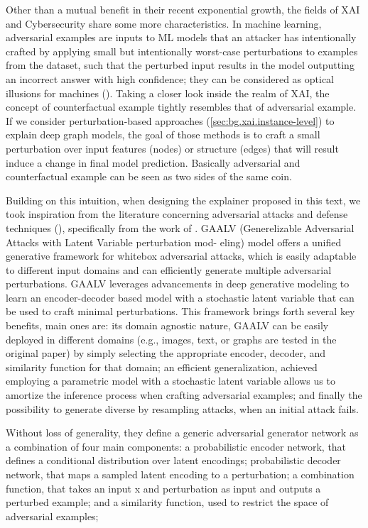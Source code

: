 \documentclass[binding=0.6cm]{sapthesis}
\newcommand{\mycite}[1]{(\cite{#1})}
\begin{document}
Other than a mutual benefit in their recent exponential growth, the fields of XAI and Cybersecurity share some more characteristics. In machine learning, adversarial examples are inputs to ML models that an attacker has intentionally crafted by applying small but intentionally worst-case perturbations to examples from the dataset, such that the perturbed input results in the model outputting an incorrect answer with high confidence; they can be considered as optical illusions for machines \mycite{goodfellow2015-harnessing}. Taking a closer look inside the realm of XAI, the concept of counterfactual example tightly resembles that of adversarial example. If we consider perturbation-based approaches (\cref{sec:bg.xai.instance-level}) to explain deep graph models, the goal of those methods is to craft a small perturbation over input features (nodes) or structure (edges) that will result induce a change in final model prediction. Basically adversarial and counterfactual example can be seen as two sides of the same coin.

Building on this intuition, when designing the explainer proposed in this text, we took inspiration from the literature concerning adversarial attacks and defense techniques \mycite{sun2023-attack-defense}, specifically from the work of \cite{bose2020-gaalvae}. GAALV (Generelizable
Adversarial Attacks with Latent Variable perturbation mod-
eling) model offers a unified generative framework for whitebox adversarial attacks, which is easily adaptable to different input domains and can efficiently generate multiple adversarial perturbations. GAALV leverages advancements in deep generative modeling to learn an encoder-decoder based model with a stochastic latent variable that can be used to craft minimal perturbations. This framework brings forth several key benefits, main ones are: its domain agnostic nature, GAALV can be easily deployed in different domains (e.g., images, text, or graphs are tested in the original paper) by simply selecting the appropriate encoder, decoder, and similarity function for that domain; an efficient generalization, achieved employing a parametric model with a stochastic latent variable allows us to amortize the inference process when crafting adversarial examples; and finally the possibility to generate diverse by resampling attacks, when an initial attack fails. 

Without loss of generality, they define a generic adversarial generator network as a combination of four main components: a probabilistic encoder network, that defines a conditional distribution over latent encodings; probabilistic decoder network, that maps a sampled latent encoding to a perturbation; a combination function, that takes an input x and perturbation as input and outputs a perturbed example; and a similarity function, used to restrict the space of adversarial examples;
\end{document}
